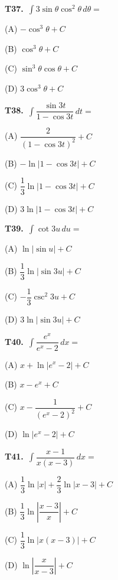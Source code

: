 \documentclass[11pt]{article}
\begin{document}
\bigskip\noindent\textbf{T37.}\ $\displaystyle\int 3\sin\theta\cos^2\theta\,d\theta =$
\begin{list}{}{\setlength{\leftmargin}{3em}\setlength{\labelwidth}{2.5em}\setlength{\itemsep}{0pt}\setlength{\topsep}{2pt}}
\item[(A)] $-\cos^3\theta+C$
\item[(B)] $\cos^3\theta+C$
\item[(C)] $\sin^3\theta\cos\theta+C$
\item[(D)] $3\cos^3\theta+C$
\end{list}

\bigskip\noindent\textbf{T38.}\ $\displaystyle\int \dfrac{\sin 3t}{1-\cos 3t}\,dt =$
\begin{list}{}{\setlength{\leftmargin}{3em}\setlength{\labelwidth}{2.5em}\setlength{\itemsep}{0pt}\setlength{\topsep}{2pt}}
\item[(A)] $\dfrac{2}{(1-\cos 3t)^2}+C$
\item[(B)] $-\ln|1-\cos 3t|+C$
\item[(C)] $\dfrac{1}{3}\ln|1-\cos 3t|+C$
\item[(D)] $3\ln|1-\cos 3t|+C$
\end{list}

\bigskip\noindent\textbf{T39.}\ $\displaystyle\int \cot 3u\,du =$
\begin{list}{}{\setlength{\leftmargin}{3em}\setlength{\labelwidth}{2.5em}\setlength{\itemsep}{0pt}\setlength{\topsep}{2pt}}
\item[(A)] $\ln|\sin u|+C$
\item[(B)] $\dfrac{1}{3}\ln|\sin 3u|+C$
\item[(C)] $-\dfrac{1}{3}\csc^2 3u+C$
\item[(D)] $3\ln|\sin 3u|+C$
\end{list}

\bigskip\noindent\textbf{T40.}\ $\displaystyle\int \dfrac{e^x}{e^x-2}\,dx =$
\begin{list}{}{\setlength{\leftmargin}{3em}\setlength{\labelwidth}{2.5em}\setlength{\itemsep}{0pt}\setlength{\topsep}{2pt}}
\item[(A)] $x+\ln|e^x-2|+C$
\item[(B)] $x-e^x+C$
\item[(C)] $x-\dfrac{1}{(e^x-2)^2}+C$
\item[(D)] $\ln|e^x-2|+C$
\end{list}

\bigskip\noindent\textbf{T41.}\ $\displaystyle\int \dfrac{x-1}{x(x-3)}\,dx =$
\begin{list}{}{\setlength{\leftmargin}{3em}\setlength{\labelwidth}{2.5em}\setlength{\itemsep}{0pt}\setlength{\topsep}{2pt}}
\item[(A)] $\dfrac{1}{3}\ln|x|+\dfrac{2}{3}\ln|x-3|+C$
\item[(B)] $\dfrac{1}{3}\ln\left|\dfrac{x-3}{x}\right|+C$
\item[(C)] $\dfrac{1}{3}\ln|x(x-3)|+C$
\item[(D)] $\ln\left|\dfrac{x}{x-3}\right|+C$
\end{list}
\end{document}
